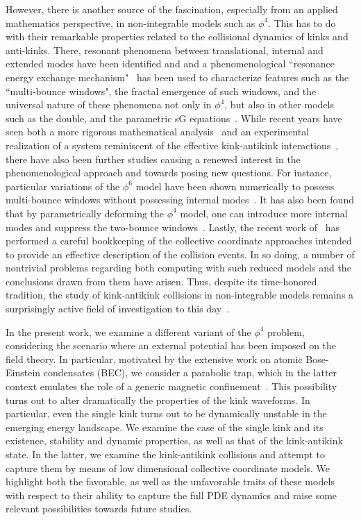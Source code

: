 \documentclass[vecphys]{svmult}		%
\begin{document}
However, there is another source of the fascination, especially from an
applied mathematics perspective, in
non-integrable models such as $\phi^4$. This has to do
with their remarkable properties related to the
collisional dynamics of kinks and anti-kinks. There,
resonant phenomena between translational, internal and extended
modes have been identified and and a phenomenological
``resonance energy exchange mechanism"~\cite{campbell}
has been used to characterize
features such as the ``multi-bounce windows", the fractal emergence
of such windows, and the universal nature of these phenomena
not only in $\phi^4$, but also in other models such as the
double, and the parametric sG equations~\cite{campbell,Campbell1,anninos}.
While recent years have seen both a more rigorous mathematical
analysis~\cite{goodman2} and an experimental realization
of a system reminiscent of the effective kink-antikink
interactions~\cite{goodman}, there have also been further studies causing
a renewed interest in the phenomenological approach and towards
posing new questions.
For instance, particular variations of the $\phi^6$ model
have been  shown numerically to possess multi-bounce windows
without possessing internal modes~\cite{shnir1}.
It has also been found that by parametrically deforming
the $\phi^4$ model, one can introduce more internal
modes and suppress the two-bounce windows~\cite{simas}.
Lastly, the recent work of~\cite{weigel,weigel2}
has performed a careful bookkeeping of the collective coordinate
approaches intended to provide an effective description of the collision
events. In so doing, a number of nontrivial problems regarding
both computing with such reduced models and the conclusions
drawn from them have arisen. Thus, despite its time-honored tradition,
the study of kink-antikink collisions in non-integrable models remains a  surprisingly active field of investigation to
this day~\cite{gani1,danial,gani2,gani3,gani4}.


In the present work, we examine a different variant of the
$\phi^4$ problem, considering the scenario where an external
potential has been imposed on the field theory. In particular,
motivated by the extensive work on atomic Bose-Einstein condensates (BEC),
we consider a parabolic trap, which in the latter context
emulates the role of a generic magnetic
confinement~\cite{pethick,stringari,darkbook}.
This possibility turns out to alter dramatically the properties
of the kink waveforms. In particular, even the single kink
turns out to be dynamically unstable in the emerging energy
landscape. We examine the case of the single kink and
its existence, stability and dynamic properties, as well as
that of the kink-antikink state. In the latter, we examine
the kink-antikink collisions and attempt to capture them
by means of low dimensional collective coordinate models.
We highlight both the favorable, as well as the unfavorable
traits of these models with respect to their ability to capture the full PDE dynamics
and raise some relevant possibilities towards future studies.
\end{document}
